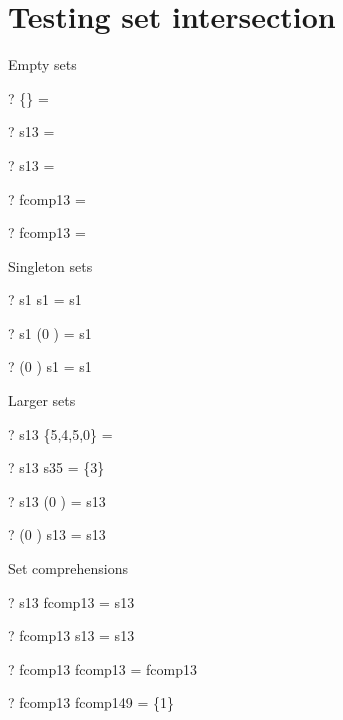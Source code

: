 \documentclass{article}
\begin{document}
\section{Testing set intersection}
Empty sets
\begin{zed} \vdash?  \{\}      \cap \emptyset[\nat] = \emptyset \end{zed}
\begin{zed} \vdash?  \emptyset \cap s13         = \emptyset \end{zed}
\begin{zed} \vdash?  s13       \cap \emptyset   = \emptyset \end{zed}
\begin{zed} \vdash?  \emptyset \cap fcomp13     = \emptyset \end{zed}
\begin{zed} \vdash?  fcomp13   \cap \emptyset   = \emptyset \end{zed}
Singleton sets
\begin{zed} \vdash?  s1        \cap s1          = s1 \end{zed}
\begin{zed} \vdash?  s1        \cap (0 ) = s1 \end{zed}
\begin{zed} \vdash?  (0 ) \cap s1        = s1 \end{zed}
Larger sets
\begin{zed} \vdash?  s13       \cap \{5,4,5,0\} = \emptyset \end{zed}
\begin{zed} \vdash?  s13       \cap s35         = \{3\} \end{zed}
\begin{zed} \vdash?  s13       \cap (0 ) = s13 \end{zed}
\begin{zed} \vdash?  (0 ) \cap s13       = s13 \end{zed}
Set comprehensions
\begin{zed} \vdash?  s13       \cap fcomp13     = s13 \end{zed}
\begin{zed} \vdash?  fcomp13   \cap s13         = s13 \end{zed}
\begin{zed} \vdash?  fcomp13   \cap fcomp13     = fcomp13 \end{zed}
\begin{zed} \vdash?  fcomp13   \cap fcomp149    = \{1\} \end{zed}
\end{document}
